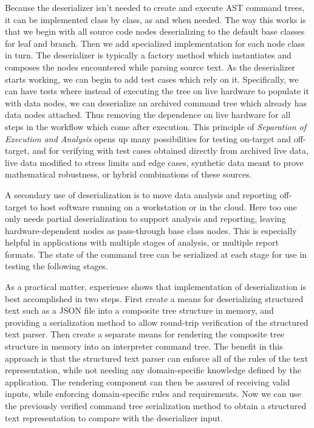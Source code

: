 \documentclass[a4paper,10pt]{article}
\begin{document}
Because the deserializer isn't needed to create and execute AST command trees, it can be implemented class by class, as and when needed. The way this works is that we begin with all source code nodes deserializing to the default base classes for leaf and branch. Then we add specialized implementation for each node class in turn. The deserializer is typically a factory method which instantiates and composes the nodes encountered while parsing source text. As the deserializer starts working, we can begin to add test cases which rely on it. Specifically, we can have tests where instead of executing the tree on live hardware to populate it with data nodes, we can deserialize an archived command tree which already has data nodes attached. Thus removing the dependence on live hardware for all steps in the workflow which come after execution. This principle of \textit{Separation of Execution and Analysis} opens up many possibilities for testing on-target and off-target, and for verifying with test cases obtained directly from archived live data, live data modified to stress limits and edge cases, synthetic data meant to prove mathematical robustness, or hybrid combinations of these sources.

A secondary use of deserialization is to move data analysis and reporting off-target to host software running on a workstation or in the cloud. Here too one only needs partial deserialization to support analysis and reporting, leaving hardware-dependent nodes as pass-through base class nodes. This is especially helpful in applications with multiple stages of analysis, or multiple report formats. The state of the command tree can be serialized at each stage for use in testing the following stages.

As a practical matter, experience shows that implementation of deserialization is best accomplished in two steps. First create a means for deserializing structured text such as a JSON file into a composite tree structure in memory, and providing a serialization method to allow round-trip verification of the structured text parser. Then create a separate means for rendering the composite tree structure in memory into an interpreter command tree. The benefit in this approach is that the structured text parser can enforce all of the rules of the text representation, while not needing any domain-specific knowledge defined by the application. The rendering component can then be assured of receiving valid inputs, while enforcing domain-specific rules and requirements. Now we can use the previously verified command tree serialization method to obtain a structured text representation to compare with the deserializer input.
\end{document}
